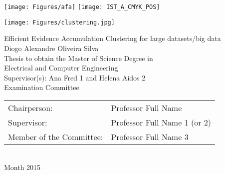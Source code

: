 
\thispagestyle {empty}

\texttt{[image: Figures/afa]}
\texttt{[image: IST\_A\_CMYK\_POS]}




\begin{center}
%
\vspace{2.5cm}
\texttt{[image: Figures/clustering.jpg]}

\vspace{1.0cm}
{\FontLb Efficient Evidence Accumulation Clustering for large datasets/big data} \\
\vspace{2.7cm}
{\FontMb Diogo Alexandre Oliveira Silva} \\
\vspace{2.0cm}
{\FontSn Thesis to obtain the Master of Science Degree in} \\
\vspace{0.3cm}
{\FontLb Electrical and Computer Engineering} \\
\vspace{1.1cm}
{\FontSn Supervisor(s): Ana Fred 1 and Helena Aidos 2} \\
\vspace{1.1cm}
{\FontMb Examination Committee} \\
\vspace{0.3cm}
{\FontSn %
\begin{tabular}{ll}
Chairperson: & Professor Full Name \\
Supervisor: & Professor Full Name 1 (or 2) \\
Member of the Committee: & Professor Full Name 3
\end{tabular} } \\
\vspace{1.5cm}
{\FontMb Month 2015} \\
%
\end{center}

\cleardoublepage

